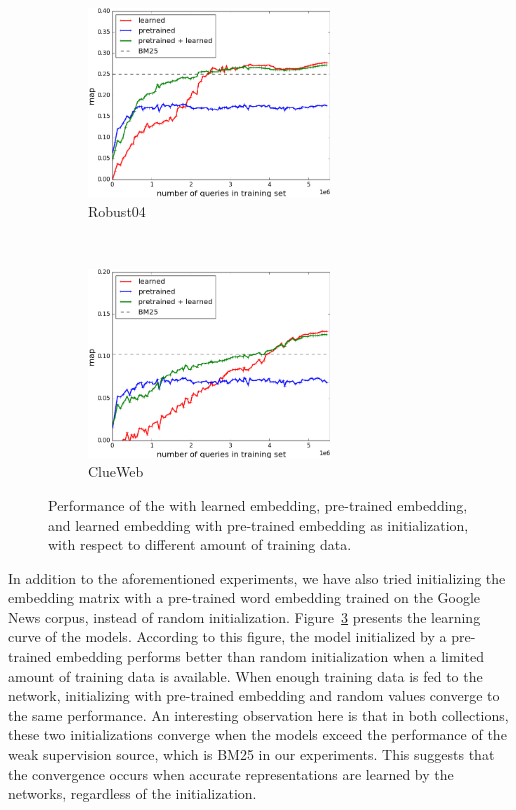 \begin{figure}[t]
    \centering
    \begin{subfigure}[t]{0.45\textwidth}
        \centering
        \includegraphics[height=5cm]{03-part-02/chapter-04/figs_and_tables/plot_with_pretrained_emb_robust.png}
        \caption{\label{fig:embedding_r}Robust04}
    \end{subfigure}%
    ~
    \begin{subfigure}[t]{0.45\textwidth}
        \centering
        \includegraphics[height=5cm]{03-part-02/chapter-04/figs_and_tables/plot_with_pretrained_emb_clueweb.png}
        \caption{\label{fig:embedding_c}ClueWeb}
    \end{subfigure}%
    \caption{\label{fig:embedding}Performance of the \modelthree with learned embedding, pre-trained embedding, and learned embedding with pre-trained embedding as initialization, with respect to different amount of training data.}
\end{figure}

In addition to the aforementioned experiments, we have also tried initializing the embedding matrix with a pre-trained word embedding trained on the Google News corpus, instead of random initialization.
%
Figure~\ref{fig:embedding} presents the learning curve of the models. According to this figure, the model initialized by a pre-trained embedding performs better than random initialization when a limited amount of training data is available. 
%
When enough training data is fed to the network, initializing with pre-trained embedding and random values converge to the same performance.
An interesting observation here is that in both collections, these two initializations converge when the models exceed the performance of the weak supervision source, which is BM25 in our experiments. 
This suggests that the convergence occurs when accurate representations are learned by the networks, regardless of the initialization.

